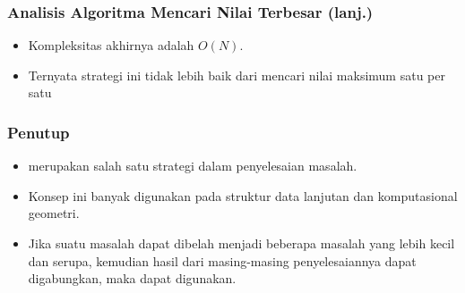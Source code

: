 \begin{frame}
\frametitle{Analisis Algoritma Mencari Nilai Terbesar (lanj.)}
\begin{itemize}
  \item Kompleksitas akhirnya adalah $O(N)$.
  \item Ternyata strategi ini tidak lebih baik dari mencari nilai maksimum satu per satu
\end{itemize}
\end{frame}

\begin{frame}
\frametitle{Penutup}
\begin{itemize}
  \item \fDivideAndConquer merupakan salah satu strategi dalam penyelesaian masalah.
  \item Konsep ini banyak digunakan pada struktur data lanjutan dan komputasional geometri.
  \item Jika suatu masalah dapat dibelah menjadi beberapa masalah yang lebih kecil dan serupa, kemudian hasil dari masing-masing penyelesaiannya dapat digabungkan, maka \fDivideAndConquer dapat digunakan.
\end{itemize}
\end{frame}


